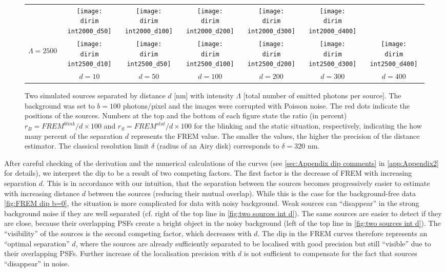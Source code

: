 \begin{figure}[!bt]
\begin{tabular}{c|cccccc}
		&\texttt{[image: \\dirim int2000\_d50]}
		&\texttt{[image: \\dirim int2000\_d100]}
		&\texttt{[image: \\dirim int2000\_d200]}
		&\texttt{[image: \\dirim int2000\_d300]}
		&\texttt{[image: \\dirim int2000\_d400]}\\
		\begin{sideways}\hspace{\vs cm}$\Lambda=2500$\end{sideways}
		&\texttt{[image: \\dirim int2500\_d10]}
		&\texttt{[image: \\dirim int2500\_d50]}
		&\texttt{[image: \\dirim int2500\_d100]}
		&\texttt{[image: \\dirim int2500\_d200]}
		&\texttt{[image: \\dirim int2500\_d300]}
		&\texttt{[image: \\dirim int2500\_d400]}\\		
		\hline	
		&$d=10$ & $d=50$ & $d=100$ & $d=200$ & $d=300$ & $d=400$\\
	\end{tabular}
	\caption{Two simulated sources separated by distance $d$ [nm] with intensity $\Lambda$ [total number of emitted photons per source]. The background was set to $b=100$ photons/pixel and the images were corrupted with Poisson noise. The red dots indicate the positions of the sources. Numbers at the top and the bottom of each figure state the ratio (in percent) $r_B=\unit{FREM}^{blink}/d\times 100$ and $r_S=\unit{FREM}^{stat}/d\times 100$ for the blinking and the static situation, respectively, indicating the how many percent of the separation $d$ represents the FREM value. The smaller the values, the higher the precision of the distance estimator. The classical resolution limit $\delta$ (radius of an Airy disk) corresponds to $\delta=320$ nm.}
	\label{fig:two sources int d}
\end{figure}
%
After careful checking of the derivation and the numerical calculations of the curves (see \autoref{sec:Appendix dip comments} in \autoref{app:Appendix2} for details), we interpret the dip to be a result of two competing factors. The first factor is the decrease of FREM with increasing separation $d$. This is in accordance with our intuition, that the separation between the sources becomes progressively easier to estimate with increasing distance $d$ between the sources (reducing their mutual overlap). While this is the case for the background-free data \autoref{fig:FREM dip b=0}, the situation is more complicated for data with noisy background. Weak sources can ``disappear'' in the strong background noise if they are well separated (cf. right of the top line in \autoref{fig:two sources int d}). The same sources are easier to detect if they are close, because their overlapping PSFs create a bright object in the noisy background (left of the top line in \autoref{fig:two sources int d}). The ``visibility'' of the sources is the second competing factor, which decreases with $d$. The dip in the FREM curves therefore represents an ``optimal separation'' $d$, where the sources are already sufficiently separated to be localised with good precision but still ``visible'' due to their overlapping PSFs. Further increase of the localisation precision with $d$ is not sufficient to compensate for the fact that sources ``disappear'' in noise.

